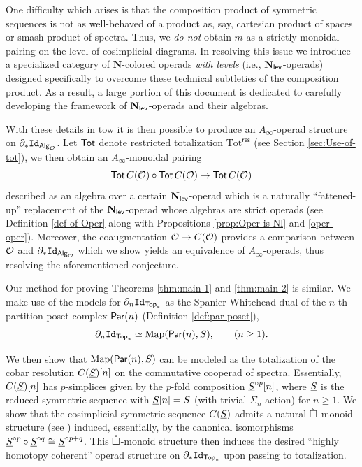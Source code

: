 One difficulty which arises is that the composition product of symmetric sequences is not as well-behaved of a product as, say, cartesian product of spaces or smash product of spectra. Thus, we \textit{do not} obtain $m$ as a strictly monoidal pairing on the level of cosimplicial diagrams. In resolving this issue we introduce a specialized category of $\mathbf{N}$-colored operads \textit{with levels} (i.e., $\mathbf{N}_{\mathsf{lev}}$-operads) designed specifically to overcome these technical subtleties of the composition product. As a result, a large portion of this document is dedicated to carefully developing the framework of $\mathbf{N}_{\mathsf{lev}}$-operads and their algebras. 

With these details in tow it is then possible to produce an $A_{\infty}$-operad structure on $\partial_* \mathtt{Id}_{{\mathsf{Alg}_{\mathcal{O}}}}$. Let $\operatorname{\mathsf{Tot}}$ denote restricted totalization $\mathrm{Tot}^{\mathsf{res}}$ (see Section \ref{sec:Use-of-tot}), we then obtain an $A_{\infty}$-monoidal pairing \[\operatorname{\mathsf{Tot}} C(\mathcal{O})\circ \operatorname{\mathsf{Tot}} C(\mathcal{O})\to \operatorname{\mathsf{Tot}} C(\mathcal{O})\] described as an algebra over a certain $\mathbf{N}_{\mathsf{lev}}$-operad which is a naturally ``fattened-up'' replacement of the $\mathbf{N}_{\mathsf{lev}}$-operad whose algebras are strict operads (see Definition \ref{def-of-Oper} along with Propositions \ref{prop:Oper-is-Nl} and \ref{oper-oper}). Moreover, the coaugmentation $\mathcal{O}\to C(\mathcal{O})$ provides a comparison between $\mathcal{O}$ and $\partial_* \mathtt{Id}_{{\mathsf{Alg}_{\mathcal{O}}}}$ which we show yields an equivalence of $A_{\infty}$-operads, thus resolving the aforementioned conjecture. 

Our method for proving Theorems \ref{thm:main-1} and \ref{thm:main-2} is similar. We make use of the models for $\partial_n \mathtt{Id}_{\mathsf{Top}_*}$  as the Spanier-Whitehead dual of the $n$-th partition poset complex $\mathsf{Par}(n)$ (Definition \ref{def:par-poset}), \[ \partial_n \mathtt{Id}_{\mathsf{Top}_*} \simeq \operatorname{Map}(\mathsf{Par}(n),S), \quad \quad (n\geq 1).\]

We then show that $\operatorname{Map}(\mathsf{Par}(n),S)$ can be modeled as the totalization of the cobar resolution $C(\underline{S})[n]$ on the commutative cooperad of spectra. Essentially, $C(\underline{S})[n]$ has $p$-simplices given by the $p$-fold composition $\underline{S}^{\circ p}[n]$, where $\underline{S}$ is the reduced symmetric sequence with $\underline{S}[n]=S$ (with trivial $\Sigma_n$ action) for $n\geq 1$. We show that the cosimplicial symmetric sequence $C(\underline{S})$ admits a natural $\mathring{\square}$-monoid structure (see \cite[Definition 5.6]{Clark-1}) induced, essentially, by the canonical isomorphisms $\underline{S}^{\circ p} \circ \underline{S}^{\circ q} \cong \underline{S}^{\circ p+q}$. This $\mathring{\square}$-monoid structure then induces the desired ``highly homotopy coherent'' operad structure on $\partial_* \mathtt{Id}_{\mathsf{Top}_*}$ upon passing to totalization. 

